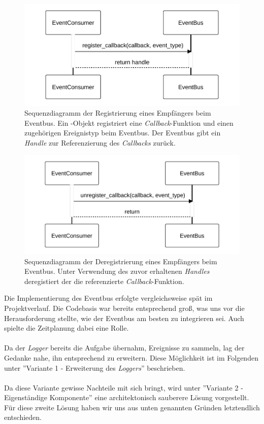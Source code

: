 \begin{figure}[!ht]
	\centering
	\includegraphics[width=0.75\linewidth]{images/diagrams/eventbus-register-seq.pdf}
	\caption{Sequenzdiagramm der Registrierung eines Empfängers beim Eventbus. Ein -Objekt registriert eine \emph{Callback}-Funktion und einen zugehörigen Ereignistyp beim Eventbus. Der Eventbus gibt ein \emph{Handle} zur Referenzierung des \emph{Callbacks} zurück.}
	\label{fig:eventbus-register-seq}
\end{figure}

\begin{figure}[!ht]
	\centering
	\includegraphics[width=0.75\linewidth]{images/diagrams/eventbus-unregister-seq.pdf}
	\caption{Sequenzdiagramm der Deregistrierung eines Empfängers beim Eventbus. Unter Verwendung des zuvor erhaltenen \emph{Handles} deregistiert der  die referenzierte \emph{Callback}-Funktion.}
	\label{fig:eventbus-unregister-seq}
\end{figure}

Die Implementierung des Eventbus erfolgte vergleichsweise spät im Projektverlauf. Die Codebasis war bereits entsprechend groß, was uns vor die Herausforderung stellte, wie der Eventbus am besten zu integrieren sei. Auch spielte die Zeitplanung dabei eine Rolle.\\
\\
Da der \emph{Logger} \cite{reisener_entwurf_2023} bereits die Aufgabe übernahm, Ereignisse zu sammeln, lag der Gedanke nahe, ihn entsprechend zu erweitern. Diese Möglichkeit ist im Folgenden unter ''Variante 1 - Erweiterung des \emph{Loggers}'' beschrieben.\\
\\
Da diese Variante gewisse Nachteile mit sich bringt, wird unter ''Variante 2 - Eigenständige Komponente'' eine architektonisch sauberere Lösung vorgestellt. Für diese zweite Lösung haben wir uns aus unten genannten Gründen letztendlich entschieden.

